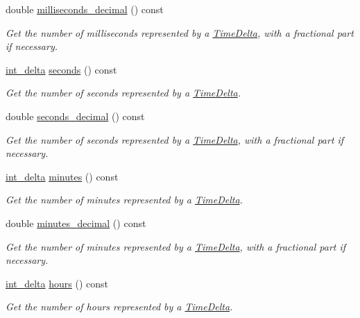\begin{DoxyCompactItemize}
double \hyperlink{structTimeDelta_a60a0277bc5fed5605850e4de83d4e50d}{milliseconds\-\_\-decimal} () const 
\begin{DoxyCompactList}\small\item\em Get the number of milliseconds represented by a \hyperlink{structTimeDelta}{Time\-Delta}, with a fractional part if necessary. \end{DoxyCompactList}\item 
\hyperlink{types_8h_a8a67cf99971c5cfeeaa2380ba84a4c92}{int\-\_\-delta} \hyperlink{structTimeDelta_aa1fe6d8a690ab04b561400c09db673ef}{seconds} () const 
\begin{DoxyCompactList}\small\item\em Get the number of seconds represented by a \hyperlink{structTimeDelta}{Time\-Delta}. \end{DoxyCompactList}\item 
double \hyperlink{structTimeDelta_a19679d7e3057197bc7844b27f0b20cfb}{seconds\-\_\-decimal} () const 
\begin{DoxyCompactList}\small\item\em Get the number of seconds represented by a \hyperlink{structTimeDelta}{Time\-Delta}, with a fractional part if necessary. \end{DoxyCompactList}\item 
\hyperlink{types_8h_a8a67cf99971c5cfeeaa2380ba84a4c92}{int\-\_\-delta} \hyperlink{structTimeDelta_a2856a4e761fc83822cc6987655035e76}{minutes} () const 
\begin{DoxyCompactList}\small\item\em Get the number of minutes represented by a \hyperlink{structTimeDelta}{Time\-Delta}. \end{DoxyCompactList}\item 
double \hyperlink{structTimeDelta_adcf5fed9ca5f425246658f252082806f}{minutes\-\_\-decimal} () const 
\begin{DoxyCompactList}\small\item\em Get the number of minutes represented by a \hyperlink{structTimeDelta}{Time\-Delta}, with a fractional part if necessary. \end{DoxyCompactList}\item 
\hyperlink{types_8h_a8a67cf99971c5cfeeaa2380ba84a4c92}{int\-\_\-delta} \hyperlink{structTimeDelta_a5135596cbf7f7ef40001e25c5aa880b3}{hours} () const 
\begin{DoxyCompactList}\small\item\em Get the number of hours represented by a \hyperlink{structTimeDelta}{Time\-Delta}. \end{DoxyCompactList}\item 

\end{DoxyCompactItemize}
